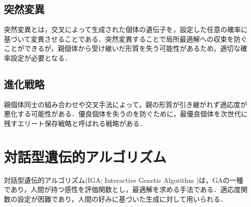 \subsection{突然変異}
突然変異とは，交叉によって生成された個体の遺伝子を，設定した任意の確率に基づいて変異させることである．突然変異することで局所最適解への収束を防ぐことができるが，親個体から受け継いだ形質を失う可能性があるため，適切な確率設定が必要となる．
\subsection{進化戦略}
親個体同士の組み合わせや交叉手法によって，親の形質が引き継がれず適応度が悪化する可能性がある．優良個体を失うのを防ぐために，最優良個体を次世代に残すエリート保存戦略と呼ばれる戦略がある．

\section{対話型遺伝的アルゴリズム}
対話型遺伝的アルゴリズム(IGA; Interactive Genetic Algorithm )は，GAの一種であり，人間が持つ感性を評価関数とし，最適解を求める手法である．適応度関数の設定が困難であり，人間の好みに基づいた生成に対して用いられる．